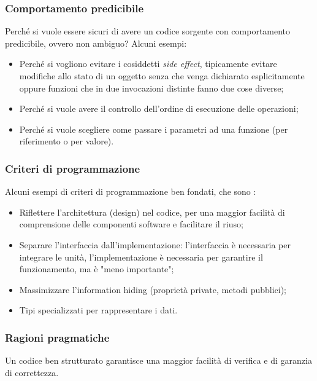 \documentclass[../main]{subfiles}
\begin{document}
\subsubsection*{Comportamento predicibile}
Perché si vuole essere sicuri di avere un codice sorgente con comportamento predicibile, ovvero non ambiguo? Alcuni esempi:
\begin{itemize}
    \item Perché si vogliono evitare i cosiddetti \textit{side effect}, tipicamente evitare modifiche allo stato di un oggetto senza che venga dichiarato esplicitamente oppure funzioni che in due invocazioni distinte fanno due cose diverse;
    \item Perché si vuole avere il controllo dell'ordine di esecuzione delle operazioni;
    \item Perché si vuole scegliere come passare i parametri ad una funzione (per riferimento o per valore).
\end{itemize}
\subsubsection*{Criteri di programmazione}
Alcuni esempi di criteri di programmazione ben fondati, che sono :
\begin{itemize}
    \item Riflettere l'architettura (design) nel codice, per una maggior facilità di comprensione delle componenti software e facilitare il riuso;
    \item Separare l'interfaccia dall'implementazione: l'interfaccia è necessaria per integrare le unità, l'implementazione è necessaria per garantire il funzionamento, ma è "meno importante";
    \item Massimizzare l'information hiding (proprietà private, metodi pubblici);
    \item Tipi specializzati per rappresentare i dati.
\end{itemize}
\subsubsection*{Ragioni pragmatiche}
Un codice ben strutturato garantisce una maggior facilità di verifica e di garanzia di correttezza.
\end{document}
